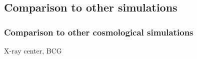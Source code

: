 % 
% 

\subsection{Comparison to other simulations}
\subsubsection{Comparison to other cosmological simulations}
% 
% 
% 
% 
% 
\cite{Cui2015} X-ray center, BCG
% 
% 
% 
